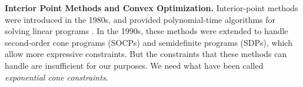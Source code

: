 \documentclass[twoside]{article}
\begin{document}
%
\textbf{Interior Point Methods and Convex Optimization.}
%
Interior-point methods  were introduced in the 1980s, and provided
polynomial-time algorithms for solving linear programs  \parencite{???}.
In the 1990s, these methods were extended to handle second-order cone programs (SOCPs) and semidefinite programs (SDPs), which allow more expressive constraints.
But the constraints that these methods can handle are insufficient for
our purposes. We need what have been called \emph{exponential cone constraints}.
\end{document}
